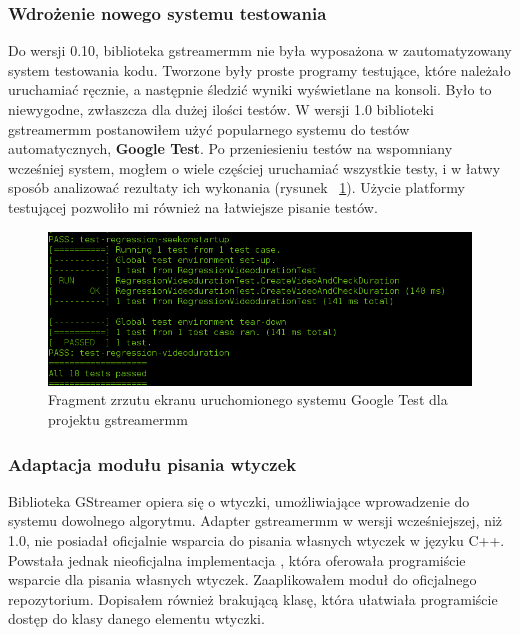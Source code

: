 \documentclass[12pt]{article}
\begin{document}
\subsubsection{Wdrożenie nowego systemu testowania}
Do wersji 0.10, biblioteka gstreamermm nie była wyposażona w zautomatyzowany system testowania kodu. Tworzone były proste programy testujące, które należało uruchamiać ręcznie, a następnie śledzić wyniki wyświetlane na konsoli. Było to niewygodne, zwłaszcza dla dużej ilości testów. W wersji 1.0 biblioteki gstreamermm postanowiłem użyć popularnego systemu do testów automatycznych, \textbf{Google Test}. Po przeniesieniu testów na wspomniany wcześniej system, mogłem o wiele częściej uruchamiać wszystkie testy, i w łatwy sposób analizować rezultaty ich wykonania (rysunek ~\ref{fig:gtestScreen}). Użycie platformy testującej pozwoliło mi również na łatwiejsze pisanie testów.
\begin{figure}[H]
  \includegraphics[width=150mm]{img/gtest-screen.png}
  \caption{Fragment zrzutu ekranu uruchomionego systemu Google Test dla projektu gstreamermm}
  \label{fig:gtestScreen}
\end{figure}
\subsubsection{Adaptacja modułu pisania wtyczek}
Biblioteka GStreamer opiera się o wtyczki, umożliwiające wprowadzenie do systemu dowolnego algorytmu. Adapter gstreamermm w wersji wcześniejszej, niż 1.0, nie posiadał oficjalnie wsparcia do pisania własnych wtyczek w języku C++. Powstała jednak nieoficjalna implementacja \cite{pepergithub}, która oferowała programiście wsparcie dla pisania własnych wtyczek. Zaaplikowałem moduł do oficjalnego repozytorium. Dopisałem również brakującą klasę, która ułatwiała programiście dostęp do klasy danego elementu wtyczki.
\end{document}
